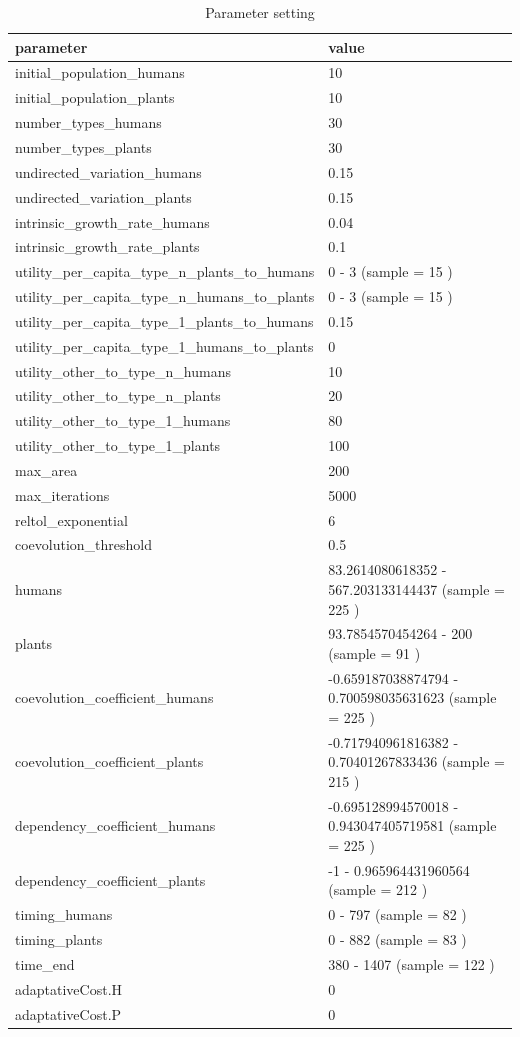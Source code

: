\documentclass[
]{book}
\begin{document}
\begin{table}[!h]

\caption{\label{tab:3mUHnPmUPnHtablepdf}Parameter setting}
\centering
\begin{tabular}[t]{l|l}
\hline
parameter & value\\
\hline
initial\_population\_humans & 10\\
\hline
initial\_population\_plants & 10\\
\hline
number\_types\_humans & 30\\
\hline
number\_types\_plants & 30\\
\hline
undirected\_variation\_humans & 0.15\\
\hline
undirected\_variation\_plants & 0.15\\
\hline
intrinsic\_growth\_rate\_humans & 0.04\\
\hline
intrinsic\_growth\_rate\_plants & 0.1\\
\hline
utility\_per\_capita\_type\_n\_plants\_to\_humans & 0 - 3 (sample = 15 )\\
\hline
utility\_per\_capita\_type\_n\_humans\_to\_plants & 0 - 3 (sample = 15 )\\
\hline
utility\_per\_capita\_type\_1\_plants\_to\_humans & 0.15\\
\hline
utility\_per\_capita\_type\_1\_humans\_to\_plants & 0\\
\hline
utility\_other\_to\_type\_n\_humans & 10\\
\hline
utility\_other\_to\_type\_n\_plants & 20\\
\hline
utility\_other\_to\_type\_1\_humans & 80\\
\hline
utility\_other\_to\_type\_1\_plants & 100\\
\hline
max\_area & 200\\
\hline
max\_iterations & 5000\\
\hline
reltol\_exponential & 6\\
\hline
coevolution\_threshold & 0.5\\
\hline
humans & 83.2614080618352 - 567.203133144437 (sample = 225 )\\
\hline
plants & 93.7854570454264 - 200 (sample = 91 )\\
\hline
coevolution\_coefficient\_humans & -0.659187038874794 - 0.700598035631623 (sample = 225 )\\
\hline
coevolution\_coefficient\_plants & -0.717940961816382 - 0.70401267833436 (sample = 215 )\\
\hline
dependency\_coefficient\_humans & -0.695128994570018 - 0.943047405719581 (sample = 225 )\\
\hline
dependency\_coefficient\_plants & -1 - 0.965964431960564 (sample = 212 )\\
\hline
timing\_humans & 0 - 797 (sample = 82 )\\
\hline
timing\_plants & 0 - 882 (sample = 83 )\\
\hline
time\_end & 380 - 1407 (sample = 122 )\\
\hline
adaptativeCost.H & 0\\
\hline
adaptativeCost.P & 0\\
\hline
\end{tabular}
\end{table}
\end{document}
